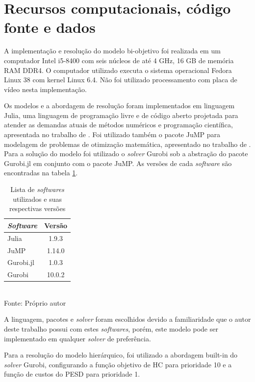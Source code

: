 \section{Recursos computacionais, código fonte e dados}

A implementação e resolução do modelo bi-objetivo foi realizada em um computador Intel i5-8400 com seis núcleos de até 4 GHz, 16 GB de memória RAM DDR4. O computador utilizado executa o sistema operacional Fedora Linux 38 com kernel Linux 6.4. Não foi utilizado processamento com placa de vídeo nesta implementação.

Os modelos e a abordagem de resolução foram implementados em linguagem Julia, uma linguagem de programação livre e de código aberto projetada para atender as demandas atuais de métodos numéricos e programação científica, apresentada no trabalho de . Foi utilizado também o pacote JuMP para modelagem de problemas de otimização matemática,  apresentado no trabalho de . Para a solução do modelo foi utilizado o \textit{solver} Gurobi \cite{gurobi} sob a abstração do pacote Gurobi.jl \cite{gurobijl} em conjunto com o pacote JuMP. As versões de cada \textit{software} são encontradas na tabela \ref{tab:list_soft}.

\begin{table}[ht]
\centering
\caption{Lista de \textit{softwares} utilizados e suas respectivas versões}
\label{tab:list_soft}
\begin{tabular}{@{}lc@{}}
\toprule
\textit{Software} & Versão   \\ \midrule
Julia                              & 1.9.3    \\
JuMP                               & 1.14.0   \\
Gurobi.jl                          & 1.0.3    \\
Gurobi                             & 10.0.2 \\ \bottomrule
\end{tabular}
\\Fonte: Próprio autor
\end{table}

A linguagem, pacotes e \textit{solver} foram escolhidos devido a familiaridade que o autor deste trabalho possui com estes \textit{softwares}, porém, este modelo pode ser implementado em qualquer \textit{solver} de preferência. 

Para a resolução do modelo hierárquico, foi utilizado a abordagem built-in do \textit{solver} Gurobi, configurando a função objetivo de \ac{HC} para prioridade 10 e a função de custos do \ac{PESD} para prioridade 1.

